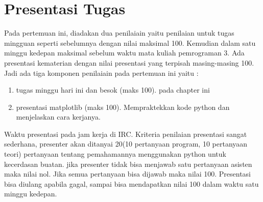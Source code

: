 \section{Presentasi Tugas}
Pada pertemuan ini, diadakan dua penilaiain yaitu penilaian untuk tugas mingguan seperti sebelumnya dengan nilai maksimal 100. Kemudian dalam satu minggu kedepan maksimal sebelum waktu mata kuliah pemrograman 3. Ada presentasi kematerian dengan nilai presentasi yang terpisah masing-masing 100. Jadi ada tiga komponen penilaiain pada pertemuan ini yaitu :
\begin{enumerate}
	\item tugas minggu hari ini dan besok (maks 100). pada chapter ini
	\item presentasi matplotlib (maks 100). Mempraktekkan kode python dan menjelaskan cara kerjanya.
\end{enumerate}
Waktu presentasi pada jam kerja di IRC. Kriteria penilaian presentasi sangat sederhana, presenter akan ditanyai 20(10 pertanyaan program, 10 pertanyaan teori) pertanyaan tentang pemahamannya menggunakan python untuk kecerdasan buatan. jika presenter tidak bisa menjawab satu pertanyaan asisten maka nilai nol. Jika semua pertanyaan bisa dijawab maka nilai 100. Presentasi bisa diulang apabila gagal, sampai bisa mendapatkan nilai 100 dalam waktu satu minggu kedepan.




